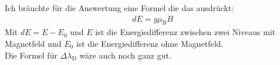 Ich bräuchte für die Auswertung eine Formel die das ausdrückt:
\begin{align}\label{eq:Energieverschiebung}
	dE = g\mu_\text{B}B
\end{align}
Mit $dE = E-E_0$ und $E$ ist die Energiedifferenz zwischen zwei Niveaus mit Magnetfeld und $E_0$ ist die Energiedifferenz ohne Magnetfeld. \\
Die Formel für $\Delta\lambda_\text{D}$ wäre auch noch ganz gut.